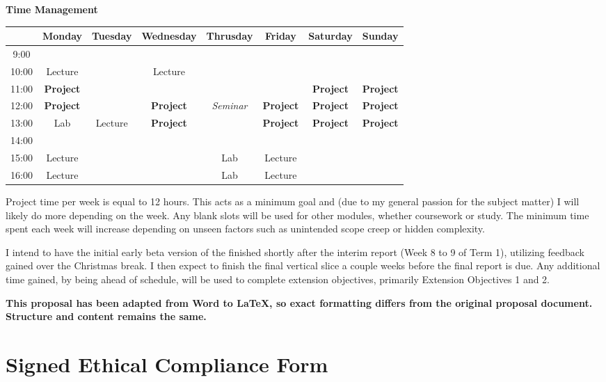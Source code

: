 \documentclass{report}
\begin{document}
\begin{appendices}
\textbf{Time Management}

\begin{table}[htbp]
\begin{tabular}{|c|c|c|c|c|c|c|c|}
\hline
 & Monday & Tuesday & Wednesday & Thrusday & Friday & Saturday & Sunday \\
\hline
9:00 &&&&&&& \\
\hline
10:00 & Lecture & & Lecture &&&& \\
\hline
11:00 & \textbf{Project} &&&&&  \textbf{Project} &  \textbf{Project} \\
\hline
12:00 & \textbf{Project} & & \textbf{Project} & \textit{Seminar} & \textbf{Project} & \textbf{Project} & \textbf{Project} \\
\hline
13:00 & Lab & Lecture &  \textbf{Project} & &  \textbf{Project} &  \textbf{Project} &  \textbf{Project} \\
\hline
14:00 &&&&&&& \\
\hline
15:00 & Lecture & & & Lab & Lecture && \\
\hline
16:00 & Lecture & & & Lab & Lecture && \\
\hline
\end{tabular}
\label{tab:schedule}
\end{table}

Project time per week is equal to 12 hours. This acts as a minimum goal and (due to my general passion for the subject matter) I will likely do more depending on the week. Any blank slots will be used for other modules, whether coursework or study. The minimum time spent each week will increase depending on unseen factors such as unintended scope creep or hidden complexity.

I intend to have the initial early beta version of the finished shortly after the interim report (Week 8 to 9 of Term 1), utilizing feedback gained over the Christmas break. I then expect to finish the final vertical slice a couple weeks before the final report is due. Any additional time gained, by being ahead of schedule, will be used to complete extension objectives, primarily Extension Objectives 1 and 2.

\noindent\makebox[\linewidth]{\rule{\paperwidth}{0.4pt}}

\begin{center}
\textbf{This proposal has been adapted from Word to \LaTeX{}, so exact formatting differs from the original proposal document. Structure and content remains the same.}
\end{center}

\chapter{Signed Ethical Compliance Form}



\end{appendices}
\end{document}
